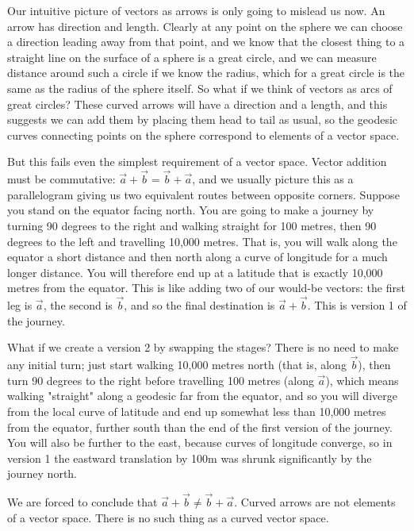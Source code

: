 Our intuitive picture of vectors as arrows is only going to mislead us now. An arrow has direction and length. Clearly at any point on the sphere we can choose a direction leading away from that point, and we know that the closest thing to a straight line on the surface of a sphere is a great circle, and we can measure distance around such a circle if we know the radius, which for a great circle is the same as the radius of the sphere itself. So what if we think of vectors as arcs of great circles? These curved arrows will have a direction and a length, and this suggests we can add them by placing them head to tail as usual, so the geodesic curves connecting points on the sphere correspond to elements of a vector space.

But this fails even the simplest requirement of a vector space. Vector addition must be commutative: $\vec{a} + \vec{b} = \vec{b} + \vec{a}$, and we usually picture this as a parallelogram giving us two equivalent routes between opposite corners. Suppose you stand on the equator facing north. You are going to make a journey by turning 90 degrees to the right and walking straight for 100 metres, then 90 degrees to the left and travelling 10,000 metres. That is, you will walk along the equator a short distance and then north along a curve of longitude for a much longer distance. You will therefore end up at a latitude that is exactly 10,000 metres from the equator. This is like adding two of our would-be vectors: the first leg is $\vec{a}$, the second is $\vec{b}$, and so the final destination is $\vec{a} + \vec{b}$. This is version 1 of the journey. 

What if we create a version 2 by swapping the stages? There is no need to make any initial turn; just start walking 10,000 metres north (that is, along $\vec{b}$), then turn 90 degrees to the right before travelling 100 metres (along $\vec{a}$), which means walking "straight" along a geodesic far from the equator, and so you will diverge from the local curve of latitude and end up somewhat less than 10,000 metres from the equator, further south than the end of the first version of the journey. You will also be further to the east, because curves of longitude converge, so in version 1 the eastward translation by 100m was shrunk significantly by the journey north.

We are forced to conclude that $\vec{a} + \vec{b} \ne \vec{b} + \vec{a}$. Curved arrows are not elements of a vector space. There is no such thing as a curved vector space.

